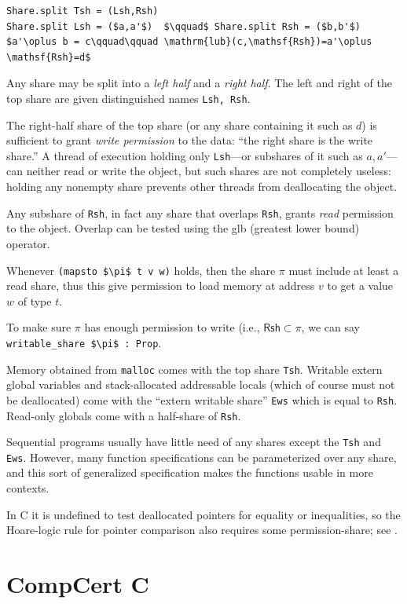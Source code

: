 \documentclass[12pt,fleqn,openany,oneside,showtrims]{memoir}
\newcommand{\ychapter}[2]{\chapter[#1]{#1 \hfill \normalsize #2}}
\begin{document}
\begin{lstlisting}
Share.split Tsh = (Lsh,Rsh)
Share.split Lsh = ($a,a'$)  $\qquad$ Share.split Rsh = ($b,b'$)
$a'\oplus b = c\qquad\qquad \mathrm{lub}(c,\mathsf{Rsh})=a'\oplus \mathsf{Rsh}=d$
\end{lstlisting}
Any share may be split into a \emph{left half} and a \emph{right half}.
The left and right of the top share are given distinguished names
\lstinline{Lsh, Rsh}.

The right-half share of the top share (or any share containing it such
as $d$) is sufficient to grant \emph{write permission} to the data:
``the right share is the write share.''  A thread of execution holding
only \lstinline{Lsh}---or subshares of it such as $a,a'$---can neither
read or write the object, but such shares are not completely useless:
holding any nonempty share prevents other threads from deallocating
the object.

Any subshare of \lstinline{Rsh}, in fact any share that overlaps
 \lstinline{Rsh}, grants \emph{read} permission to the object.
Overlap can be tested using the glb (greatest lower bound) operator.

Whenever \lstinline{(mapsto $\pi$ t v w)} holds, then the share $\pi$
must include at least a read share, thus this give permission to load
memory at address $v$ to get a value $w$ of type $t$.

To make sure $\pi$ has enough permission to write (i.e.,
$\mathsf{Rsh} \subset \pi$, we can say \lstinline{writable_share $\pi$ : Prop}.

Memory obtained from \lstinline{malloc} comes with the top share
\lstinline{Tsh}.  Writable extern global variables
and stack-allocated addressable locals (which of course
must not be deallocated) come with the ``extern writable share''
\lstinline{Ews} which is equal to \lstinline{Rsh}.
Read-only globals come with a half-share of \lstinline{Rsh}.

Sequential programs usually have little need of any shares except
the \lstinline{Tsh} and \lstinline{Ews}.  However, many function
specifications can be parameterized over any share, and this sort
of generalized specification makes the functions usable in more contexts.

In C it is undefined to test deallocated pointers for equality or inequalities,
so the Hoare-logic rule for pointer comparison also requires some
permission-share; see .


\ychapter{CompCert C}{}
\end{document}
